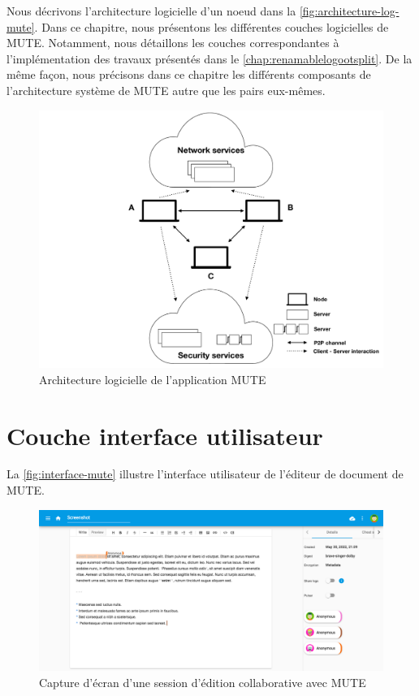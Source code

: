 \documentclass[12pt]{thesul}
\begin{document}
Nous décrivons l'architecture logicielle d'un noeud dans la \autoref{fig:architecture-log-mute}.
Dans ce chapitre, nous présentons les différentes couches logicielles de MUTE.
Notamment, nous détaillons les couches correspondantes à l'implémentation des travaux présentés dans le \autoref{chap:renamablelogootsplit}.
De la même façon, nous précisons dans ce chapitre les différents composants de l'architecture système de MUTE autre que les pairs eux-mêmes.

\begin{figure}[!ht]
  \centering
  \includegraphics[page=2, trim=0cm 0cm 0cm 0cm, clip, width=.7\linewidth]{img/mute-figures.pdf}
  \caption{Architecture logicielle de l'application MUTE}
  \label{fig:architecture-log-mute}
\end{figure}

\section{Couche interface utilisateur}

La \autoref{fig:interface-mute} illustre l'interface utilisateur de l'éditeur de document de MUTE.

\begin{figure}[!ht]
  \centering
  \includegraphics[width=\linewidth]{img/screenshot-mute.png}
  \caption{Capture d'écran d'une session d'édition collaborative avec MUTE}
  \label{fig:interface-mute}
\end{figure}
\end{document}
